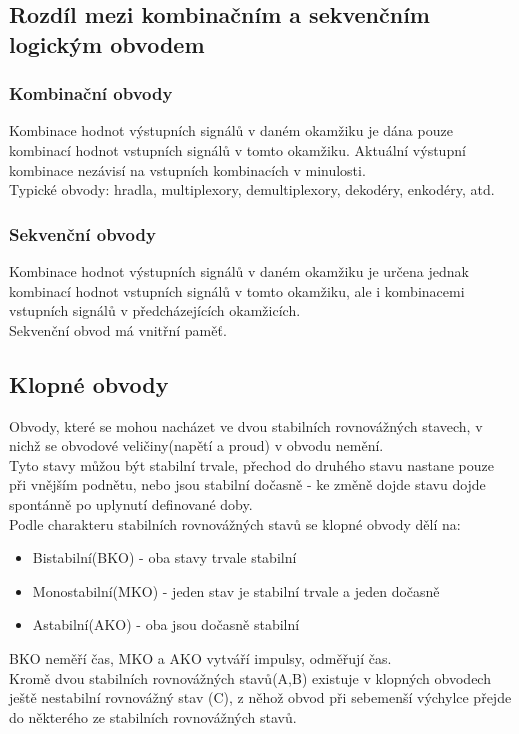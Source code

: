 \subsection{Rozdíl mezi kombinačním a sekvenčním logickým obvodem}
\subsubsection{Kombinační obvody}
Kombinace hodnot výstupních signálů v daném okamžiku je dána pouze kombinací hodnot vstupních signálů v tomto okamžiku. Aktuální výstupní kombinace nezávisí na vstupních kombinacích v minulosti.\\
Typické obvody: hradla, multiplexory, demultiplexory, dekodéry, enkodéry, atd.

\subsubsection{Sekvenční obvody}
Kombinace hodnot výstupních signálů v daném okamžiku je určena jednak kombinací hodnot vstupních signálů v tomto okamžiku, ale i kombinacemi vstupních signálů v předcházejících okamžicích.\\
Sekvenční obvod má vnitřní paměť.\\

\subsection{Klopné obvody}
Obvody, které se mohou nacházet ve dvou stabilních rovnovážných stavech, v nichž se obvodové veličiny(napětí a proud) v obvodu nemění.\\
Tyto stavy můžou být stabilní trvale, přechod do druhého stavu nastane pouze při vnějším podnětu, nebo jsou stabilní dočasně - ke změně dojde stavu dojde spontánně po uplynutí definované doby.\\
Podle charakteru stabilních rovnovážných stavů se klopné obvody dělí na:
\begin{itemize}
    \item Bistabilní(BKO) - oba stavy trvale stabilní
    \item Monostabilní(MKO) - jeden stav je stabilní trvale a jeden dočasně
    \item Astabilní(AKO) - oba jsou dočasně stabilní
\end{itemize}
BKO neměří čas, MKO a AKO vytváří impulsy, odměřují čas.\\
Kromě dvou stabilních rovnovážných stavů(A,B) existuje v klopných obvodech ještě nestabilní rovnovážný stav (C), z něhož obvod při sebemenší výchylce přejde do některého ze stabilních rovnovážných stavů.\\
